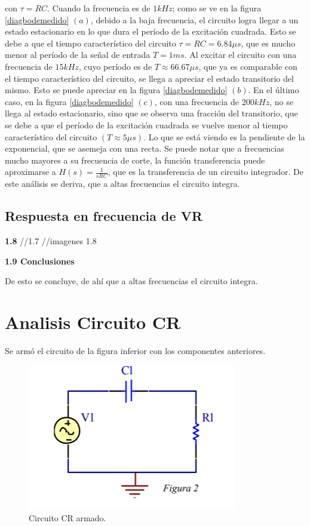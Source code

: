 con $\tau=RC$.
Cuando la frecuencia es de $1kHz$; como se ve en la figura \ref{diagbodemedido} $(a)$, debido a la baja frecuencia, el circuito logra llegar a un estado estacionario en lo que dura el período de la excitación cuadrada. Esto se debe a que el tiempo característico del circuito $\tau=RC=6.84\mu s$, que es mucho menor al período de la señal de entrada $T=1ms$.
Al excitar el circuito con una frecuencia de $15kHz$, cuyo período es de $ T\approx 66.67\mu s$, que ya es comparable con el tiempo característico del circuito, se llega a apreciar el estado transitorio del mismo. Esto se puede apreciar en la figura \ref{diagbodemedido} $(b)$.
En el último caso, en la figura \ref{diagbodemedido} $(c)$, con una frecuencia de $200kHz$, no se llega al estado estacionario, sino que se observa una fracción del transitorio, que se debe a que el período de la excitación cuadrada se vuelve menor al tiempo característico del circuito $(T\approx 5\mu s)$. Lo que se está viendo es la pendiente de la exponencial, que se asemeja con una recta.
Se puede notar que a frecuencias mucho mayores a su frecuencia de corte, la función transferencia puede aproximarse a $H(s)=\frac{1}{sRC}$, que es la transferencia de un circuito integrador. De este análisis se deriva, que a altas frecuencias el circuito integra.

\subsection{Respuesta en frecuencia de VR}




\textbf{1.8}
//1.7
//imagenes 1.8

\textbf{1.9 Conclusiones}

De esto se concluye, de ahí que a altas frecuencias el circuito integra.

\section{Analisis Circuito CR}

Se armó el circuito de la figura inferior con los componentes anteriores.

\begin{figure}[h!]
\centering
\includegraphics[scale=0.5]{crCircuito.png}
\caption{Circuito CR armado.}
\label{fig:CR}
\end{figure}


